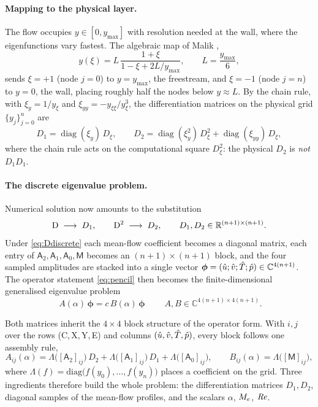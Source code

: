 \documentclass[11pt]{article}
\begin{document}
\paragraph{Mapping to the physical layer.} The flow occupies $y\in[0,y_{\max}]$ with resolution
needed at the wall, where the eigenfunctions vary fastest. The algebraic map of Malik
\cite{malik1990},
\begin{equation}\label{eq:chebmap}
  y(\xi)=L\,\frac{1+\xi}{1-\xi+2L/y_{\max}},\qquad L=\frac{y_{\max}}{6},
\end{equation}
sends $\xi=+1$ (node $j{=}0$) to $y=y_{\max}$, the freestream, and $\xi=-1$ (node $j{=}n$) to
$y=0$, the wall, placing roughly half the nodes below $y\approx L$. By the
chain rule, with $\xi_y=1/y_\xi$ and $\xi_{yy}=-y_{\xi\xi}/y_\xi^3$, the differentiation matrices
on the physical grid $\{y_j\}_{j=0}^{n}$ are
\begin{equation}\label{eq:Dmats}
  D_1=\operatorname{diag}(\xi_y)\,D_\xi,\qquad
  D_2=\operatorname{diag}(\xi_y^2)\,D_\xi^2+\operatorname{diag}(\xi_{yy})\,D_\xi ,
\end{equation}
where the chain rule acts on the computational square $D_\xi^2$: the physical $D_2$ is \emph{not}
$D_1D_1$.

\paragraph{The discrete eigenvalue problem.} Numerical solution now amounts to the substitution
\begin{equation}\label{eq:Ddiscrete}
  \mathrm{D}\;\longrightarrow\;D_1,\qquad \mathrm{D}^2\;\longrightarrow\;D_2,\qquad
  D_1,D_2\in\mathbb R^{(n+1)\times(n+1)}.
\end{equation}
Under \eqref{eq:Ddiscrete} each mean-flow coefficient becomes a diagonal
matrix, each entry of $\mathsf A_2,\mathsf A_1,\mathsf A_0,\mathsf M$ becomes an
$(n{+}1)\times(n{+}1)$ block, and the four sampled amplitudes are stacked into a single vector
$\boldsymbol\phi=(\hat{u};\hat{v};\hat{T};\hat{p})\in\mathbb C^{4(n+1)}$. The operator statement
\eqref{eq:pencil} then becomes the finite-dimensional generalised eigenvalue problem
\begin{equation}\label{eq:gevp}
  \boxed{\;A(\alpha)\,\boldsymbol\phi=c\,B(\alpha)\,\boldsymbol\phi\;}\qquad
  A,B\in\mathbb C^{4(n+1)\times4(n+1)}.
\end{equation}

Both matrices inherit the $4\times4$ block structure of the operator form. With $i,j$ over the rows
(C,\,X,\,Y,\,E) and columns $(\hat{u},\hat{v},\hat{T},\hat{p})$, every block follows one assembly rule,
\begin{equation}\label{eq:blocks}
  A_{ij}(\alpha)=\Lambda\big([\mathsf A_2]_{ij}\big)\,D_2+\Lambda\big([\mathsf A_1]_{ij}\big)\,D_1
  +\Lambda\big([\mathsf A_0]_{ij}\big),
  \qquad
  B_{ij}(\alpha)=\Lambda\big([\mathsf M]_{ij}\big),
\end{equation}
where $\Lambda(f)=\mathrm{diag}\big(f(y_0),\dots,f(y_n)\big)$ places a coefficient on the grid. Three
ingredients therefore build the whole problem: the differentiation matrices $D_1,D_2$, diagonal
samples of the mean-flow profiles, and the scalars $\alpha$, $M_e$, $\mathit{Re}$.
\end{document}
